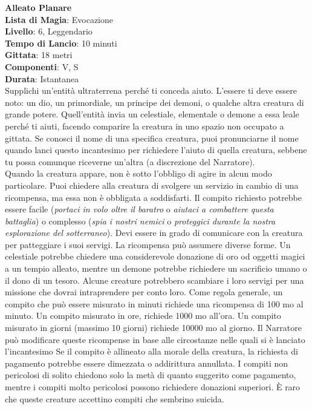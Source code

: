 \documentclass[a4paper,twoside,openany]{book}
\begin{document}
\begin{multicols}{2}

\medskip\textbf{Alleato Planare}\\
\textbf{Lista di Magia}: Evocazione\\
\textbf{Livello}: 6, Leggendario\\
\textbf{Tempo di Lancio}: 10 minuti\\
\textbf{Gittata}: 18 metri\\
\textbf{Componenti}: V, S\\
\textbf{Durata}: Istantanea\\
Supplichi un'entità ultraterrena perché ti conceda aiuto. L'essere ti deve essere noto: un dio, un primordiale, un principe dei demoni, o qualche altra creatura di grande potere. Quell'entità invia un celestiale, elementale o demone a essa leale perché ti aiuti, facendo comparire la creatura in uno spazio non occupato a gittata. Se conosci il nome di una specifica creatura, puoi pronunciarne il nome quando lanci questo incantesimo per richiedere l'aiuto di quella creatura, sebbene tu possa comunque riceverne un'altra (a discrezione del Narratore).\\
Quando la creatura appare, non è sotto l'obbligo di agire in alcun modo particolare. Puoi chiedere alla creatura di svolgere un servizio in cambio di una ricompensa, ma essa non è obbligata a soddisfarti. Il compito richiesto potrebbe essere facile (\emph{portaci in volo oltre il baratro} o \emph{aiutaci a combattere questa battaglia}) o complesso (\emph{spia i nostri nemici} o \emph{proteggici durante la nostra esplorazione del sotterraneo}). Devi essere in grado di comunicare con la creatura per patteggiare i suoi servigi. La ricompensa può assumere diverse forme. Un celestiale potrebbe chiedere una considerevole donazione di oro od oggetti magici a un tempio alleato, mentre un demone potrebbe richiedere un sacrificio umano o il dono di un tesoro. Alcune creature potrebbero scambiare i loro servigi per una missione che dovrai intraprendere per conto loro. Come regola generale, un compito che può essere misurato in minuti richiede una ricompensa di 100 mo al minuto. Un compito misurato in ore, richiede 1000 mo all'ora. Un compito misurato in giorni (massimo 10 giorni) richiede 10000 mo al giorno. Il Narratore può modificare queste ricompense in base alle circostanze nelle quali si è lanciato l'incantesimo Se il compito è allineato alla morale della creatura, la richiesta di pagamento potrebbe essere dimezzata o addirittura annullata. I compiti non pericolosi di solito chiedono solo la metà di quanto suggerito come pagamento, mentre i compiti molto pericolosi possono richiedere donazioni superiori. È raro che queste creature accettino compiti che sembrino suicida.\\

\end{multicols}
\end{document}
